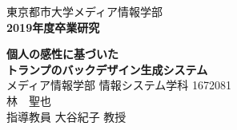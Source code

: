 \documentclass[fleqn,11pt]{jreport}
\begin{document}
\baselineskip 21.5pt

\begin{titlepage}
\vspace*{3cm}
\begin{center}
{\Large\gt 東京都市大学メディア情報学部}\\
\vspace*{0.5cm}
{\Large\bf 2019年度卒業研究}\\
\vspace{1.5cm}


{\huge\bf 個人の感性に基づいた}\\
\vspace{0.5cm}
{\huge\bf トランプのバックデザイン生成システム}\\

\vspace{9cm}
{\Large メディア情報学部 情報システム学科 1672081}\\
{\Large 林　聖也}\\
\vspace*{0.5cm}
{\Large 指導教員 大谷紀子 教授}\\
\end{center}
\end{titlepage}

\tableofcontents
\cleardoublepage











%


\appendix



\end{document}
